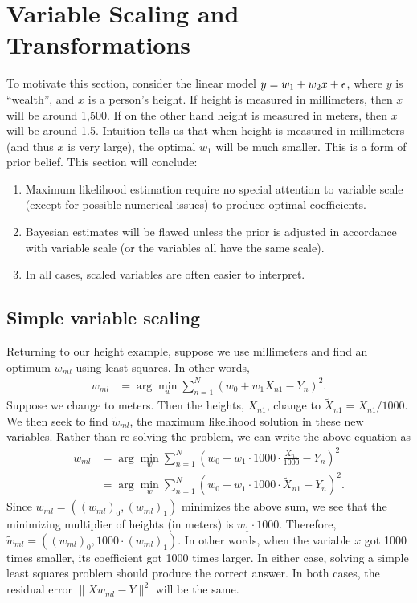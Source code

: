 \section{Variable Scaling and Transformations}
To motivate this section, consider the linear model $y = w_1 + w_2x +{\epsilon}$, where $y$ is ``wealth'', and $x$ is a person's height.  If height is measured in millimeters, then $x$ will be around 1,500.  If on the other hand height is measured in meters, then $x$ will be around 1.5.  Intuition tells us that when height is measured in millimeters (and thus $x$ is very large), the optimal $w_1$ will be much smaller.  This is a form of prior belief.  This section will conclude:
\begin{enumerate}
  \item Maximum likelihood estimation require no special attention to variable scale (except for possible numerical issues) to produce optimal coefficients.
  \item Bayesian estimates will be flawed unless the prior is adjusted in accordance with variable scale (or the variables all have the same scale).
  \item In all cases, scaled variables are often easier to interpret.
\end{enumerate}
\subsection{Simple variable scaling}
Returning to our height example, suppose we use millimeters and find an optimum $w_{ml}$ using least squares.  In other words, 
\begin{align*}
  w_{ml} &= \arg\min_w \sum_{n=1}^N \left( w_0 + w_1 X_{n1} - Y_n \right)^2.
\end{align*}
Suppose we change to meters.  Then the heights, $X_{n1}$, change to $\tilde X_{n1} = X_{n1}/1000$.  We then seek to find $\tilde w_{ml}$, the maximum likelihood solution in these new variables.  Rather than re-solving the problem, we can write the above equation as
\begin{align*}
  w_{ml} &= \arg\min_w \sum_{n=1}^N \left( w_0 + w_1\cdot1000 \cdot\frac{X_{n1}}{1000} - Y_n \right)^2 \\
  &= \arg\min_w \sum_{n=1}^N \left( w_0 + w_1\cdot1000 \cdot\tilde X_{n1} - Y_n \right)^2.
\end{align*}
Since $w_{ml}= ( (w_{ml})_0, (w_{ml})_1)$ minimizes the above sum, we see that the minimizing multiplier of heights (in meters) is $w_1\cdot1000$.  Therefore, $\tilde w_{ml} = ( (w_{ml})_0, 1000\cdot(w_{ml})_1)$.  In other words, when the variable $x$ got 1000 times smaller, its coefficient got 1000 times larger.  In either case, solving a simple least squares problem should produce the correct answer.  In both cases, the residual error $\|Xw_{ml}-Y\|^2$ will be the same. 

